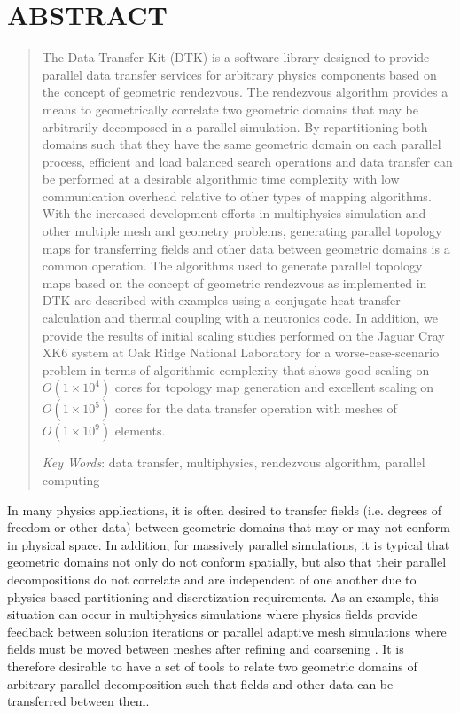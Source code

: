 \documentclass{mc2013}
\begin{document}
\section*{ABSTRACT} 
\begin{quote}
\begin{small}
The Data Transfer Kit (DTK) is a software library designed to provide
parallel data transfer services for arbitrary physics components based
on the concept of geometric rendezvous. The rendezvous algorithm
provides a means to geometrically correlate two geometric domains that
may be arbitrarily decomposed in a parallel simulation. By
repartitioning both domains such that they have the same geometric
domain on each parallel process, efficient and load balanced search
operations and data transfer can be performed at a desirable
algorithmic time complexity with low communication overhead relative
to other types of mapping algorithms. With the increased development
efforts in multiphysics simulation and other multiple mesh and
geometry problems, generating parallel topology maps for transferring
fields and other data between geometric domains is a common
operation. The algorithms used to generate parallel topology maps
based on the concept of geometric rendezvous as implemented in DTK are
described with examples using a conjugate heat transfer calculation
and thermal coupling with a neutronics code. In addition, we provide
the results of initial scaling studies performed on the Jaguar Cray
XK6 system at Oak Ridge National Laboratory for a worse-case-scenario
problem in terms of algorithmic complexity that shows good scaling on
$O(1 \times 10^4)$ cores for topology map generation and excellent
scaling on $O(1 \times 10^5)$ cores for the data transfer operation
with meshes of $O(1 \times 10^9)$ elements.


\emph{Key Words}: data transfer, multiphysics, rendezvous algorithm,
parallel computing
\end{small} 
\end{quote}

\setlength{\baselineskip}{14pt}
\normalsize

\label{sec:intro}

In many physics applications, it is often desired to transfer fields
(i.e. degrees of freedom or other data) between geometric domains that
may or may not conform in physical space. In addition, for massively
parallel simulations, it is typical that geometric domains not only do
not conform spatially, but also that their parallel decompositions do
not correlate and are independent of one another due to physics-based
partitioning and discretization requirements. As an example, this
situation can occur in multiphysics simulations where physics fields
provide feedback between solution iterations \cite{Tautges_2009_2} or
parallel adaptive mesh simulations where fields must be moved between
meshes after refining and coarsening \cite{Edwards_2006}. It is
therefore desirable to have a set of tools to relate two geometric
domains of arbitrary parallel decomposition such that fields and other
data can be transferred between them.
\end{document}
